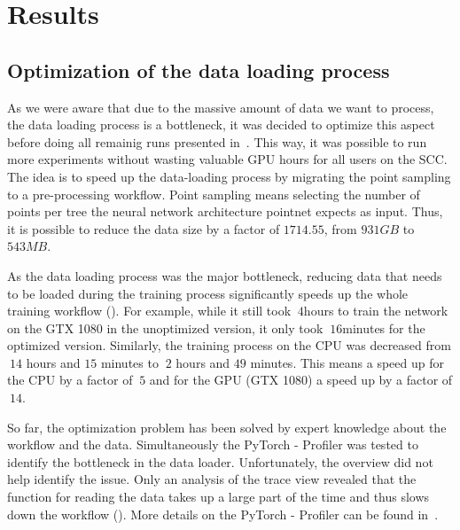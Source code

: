 \documentclass[12pt, a4paper, hidelinks]{article}
\begin{document}
\section{Results}
\label{sec:results}

\subsection{Optimization of the data loading process}
\label{sec:r-data-loading}

As we were aware that due to the massive amount of data we want to process, the data loading process is a bottleneck, it was decided to optimize this aspect before doing all remainig runs presented in~. This way, it was possible to run more experiments without wasting valuable \ac{GPU} hours for all users on the \ac{SCC}. The idea is to speed up the data-loading process by migrating the point sampling to a pre-processing workflow. Point sampling means selecting the number of points per tree the neural network architecture pointnet expects as input. Thus, it is possible to reduce the data size by a factor of $ 1714.55 $, from $931 GB $ to $543 MB $. 

As the data loading process was the major bottleneck, reducing data that needs to be loaded during the training process significantly speeds up the whole training workflow (). For example, while it still took $~4$hours to train the network on the GTX 1080 in the unoptimized version, it only took $~16$minutes for the optimized version. Similarly, the training process on the \ac{CPU} was decreased from $~14$ hours and $15$ minutes to $~2$ hours and $49$ minutes. This means a speed up for the \ac{CPU} by a factor of $~5$ and for the \ac{GPU} (GTX 1080) a speed up by a factor of $~14$.

So far, the optimization problem has been solved by expert knowledge about the workflow and the data. Simultaneously the PyTorch - Profiler was tested to identify the bottleneck in the data loader. Unfortunately, the overview did not help identify the issue. Only an analysis of the trace view revealed that the function for reading the data takes up a large part of the time and thus slows down the workflow (). More details on the PyTorch - Profiler can be found in~.
\end{document}
